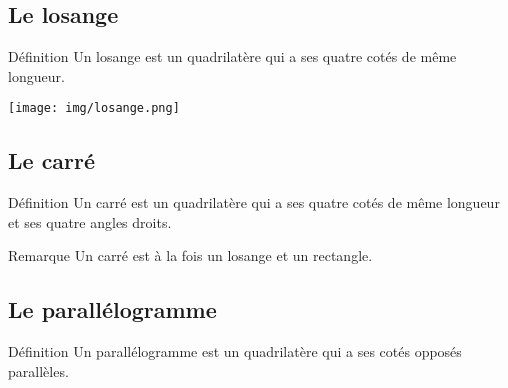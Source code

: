 \documentclass[12pt,a4paper]{article}
\begin{document}
\subsection{Le losange}
\begin{minipage}{0,7\textwidth}
\begin{definition}{Définition}
Un losange est un quadrilatère qui a ses quatre cotés de même longueur.
\end{definition}
\end{minipage}
\begin{minipage}{0,3\textwidth}
\texttt{[image: img/losange.png]} 
\end{minipage}

\subsection{Le carré}
\begin{definition}{Définition}
Un carré est un quadrilatère qui a ses quatre cotés de même longueur et ses quatre angles droits.
\end{definition}
\begin{definition}{Remarque}
Un carré est à la fois un losange et un rectangle.
\end{definition}

\subsection{Le parallélogramme}
\begin{definition}{Définition}
Un parallélogramme est un quadrilatère qui a ses cotés opposés parallèles.
\end{definition}
\end{document}
